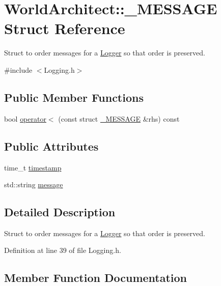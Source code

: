 \hypertarget{struct_world_architect_1_1___m_e_s_s_a_g_e}{}\section{World\+Architect\+::\+\_\+\+M\+E\+S\+S\+A\+GE Struct Reference}
\label{struct_world_architect_1_1___m_e_s_s_a_g_e}


Struct to order messages for a \mbox{\hyperlink{class_world_architect_1_1_logger}{Logger}} so that order is preserved.  




{\ttfamily \#include $<$Logging.\+h$>$}

\subsection*{Public Member Functions}
\begin{DoxyCompactItemize}
\item 
bool \mbox{\hyperlink{struct_world_architect_1_1___m_e_s_s_a_g_e_a257df8eb0dd114285000058e00862b44}{operator$<$}} (const struct \mbox{\hyperlink{struct_world_architect_1_1___m_e_s_s_a_g_e}{\+\_\+\+M\+E\+S\+S\+A\+GE}} \&rhs) const
\end{DoxyCompactItemize}
\subsection*{Public Attributes}
\begin{DoxyCompactItemize}
\item 
time\+\_\+t \mbox{\hyperlink{struct_world_architect_1_1___m_e_s_s_a_g_e_a9b9f0fbc20e147685fd92c342dfa2c46}{timestamp}}
\item 
std\+::string \mbox{\hyperlink{struct_world_architect_1_1___m_e_s_s_a_g_e_adddd59e01e902c23dd42b2ce34dff503}{message}}
\end{DoxyCompactItemize}


\subsection{Detailed Description}
Struct to order messages for a \mbox{\hyperlink{class_world_architect_1_1_logger}{Logger}} so that order is preserved. 

Definition at line 39 of file Logging.\+h.



\subsection{Member Function Documentation}
\mbox{\label{struct_world_architect_1_1___m_e_s_s_a_g_e_a257df8eb0dd114285000058e00862b44}} 
